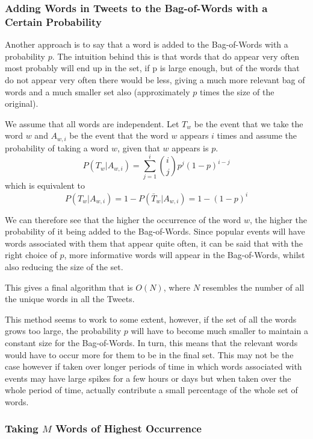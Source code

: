 \documentclass[11pt,a4paper]{article}
\begin{document}
\subsubsection{Adding Words in Tweets to the Bag-of-Words with a Certain Probability}
Another approach is to say that a word is added to the Bag-of-Words with a probability $p$. The intuition behind this is that words that do appear very often most probably will end up in the set, if p is large enough, but of the words that do not appear very often there would be less, giving a much more relevant bag of words and a much smaller set also (approximately $p$ times the size of the original).

We assume that all words are independent. Let $T_w$ be the event that we take the word $w$ and $A_{w, i}$ be the event that the word $w$ appears $i$ times and assume the probability of taking a word $w$, given that $w$ appears is $p$. 
\begin{equation*}
P\left( T_w | A_{w, i}\right) =  \sum_{j=1}^i {i \choose j} p^j\left( 1 - p\right)^{i-j}
\end{equation*}
which is equivalent to 
\begin{equation}
P\left( T_w | A_{w, i}\right)  = 1 - P(\bar{T}_w |  A_{w, i}) = 1 - (1 - p)^i
\end{equation}

We can therefore see that the higher the occurrence of the word $w$, the higher the probability of it being added to the Bag-of-Words. Since popular events will have words associated with them that appear quite often, it can be said that with the right choice of $p$, more informative words will appear in the Bag-of-Words, whilst also reducing the size of the set. 

This gives a final algorithm that is $O(N)$, where $N$ resembles the number of all the unique words in all the Tweets. 

This method seems to work to some extent, however, if the set of all the words grows too large, the probability $p$ will have to become much smaller to maintain a constant size for the Bag-of-Words. In turn, this means that the relevant words would have to occur more for them to be in the final set. This may not be the case however if taken over longer periods of time in which words associated with events may have large spikes for a few hours or days but when taken over the whole period of time, actually contribute a small percentage of the whole set of words.

\subsubsection{Taking $M$ Words of Highest Occurrence}
\end{document}
